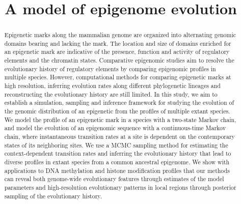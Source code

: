\documentclass[11pt]{article}
\title{A model of epigenome evolution}
\begin{document}
\maketitle

\begin{abstract}
  Epigenetic marks along the mammalian genome are organized into
  alternating genomic domains bearing and lacking the mark. The
  location and size of domains enriched for an epigenetic mark are
  indicative of the presence, function and activity of regulatory
  elements and the chromatin states. Comparative epigenomic studies
  aim to resolve the evolutionary history of regulatory elements by
  comparing epigenomic profiles in multiple species.  However,
  computational methods for comparing epigenetic marks at high
  resolution, inferring evolution rates along different phylogenetic
  lineages and reconstructing the evolutionary history are still
  limited.  In this study, we aim to establish a simulation, sampling
  and inference framework for studying the evolution of the genomic
  distribution of an epigenetic from the profiles of multiple extant
  species.  We model the profile of an epigenetic mark in a species
  with a two-state Markov chain, and model the evolution of an
  epigenomic sequence with a continuous-time Markov chain, where
  instantaneous transition rates at a site is dependent on the
  contemporary states of its neighboring sites. We use a MCMC sampling
  method for estimating the context-dependent transition rates and
  inferring the evolutionary history that lead to diverse profiles in
  extant species from a common ancestral epigenome.  We show with
  applications to DNA methylation and histone modification profiles
  that our methods can reveal both genome-wide evolutionary features
  through estimates of the model parameters and high-resolution
  evolutionary patterns in local regions through posterior sampling of
  the evolutionary history.
\end{abstract}
\end{document}
